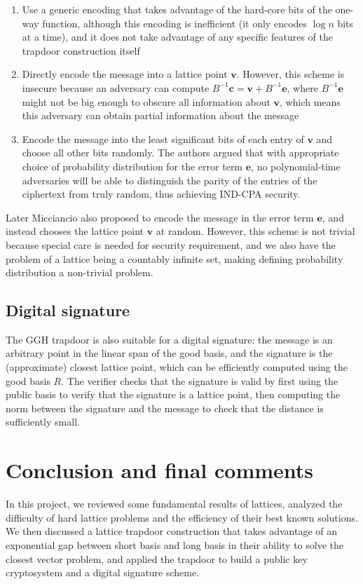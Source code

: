 \documentclass[letterpaper,12pt]{article}
\begin{document}
\begin{enumerate}
    \item Use a generic encoding that takes advantage of the hard-core bits of the one-way function, although this encoding is inefficient (it only encodes $\log{n}$ bits at a time), and it does not take advantage of any specific features of the trapdoor construction itself
    \item Directly encode the message into a lattice point $\mathbf{v}$. However, this scheme is insecure because an adversary can compute $B^{-1}\mathbf{c} = \mathbf{v} + B^{-1}\mathbf{e}$, where $B^{-1}\mathbf{e}$ might not be big enough to obscure all information about $\mathbf{v}$, which means this adversary can obtain partial information about the message
    \item Encode the message into the least significant bits of each entry of $\mathbf{v}$ and choose all other bits randomly. The authors argued that with appropriate choice of probability distribution for the error term $\mathbf{e}$, no polynomial-time adversaries will be able to distinguish the parity of the entries of the ciphertext from truly random, thus achieving IND-CPA security.
\end{enumerate}

Later Micciancio also proposed to encode the message in the error term $\mathbf{e}$, and instead chooses the lattice point $\mathbf{v}$ at random. However, this scheme is not trivial because special care is needed for security requirement, and we also have the problem of a lattice being a countably infinite set, making defining probability distribution a non-trivial problem.

\subsection{Digital signature}
The GGH trapdoor is also suitable for a digital signature: the message is an arbitrary point in the linear span of the good basis, and the signature is the (approximate) closest lattice point, which can be efficiently computed using the good basis $R$. The verifier checks that the signature is valid by first using the public basis to verify that the signature is a lattice point, then computing the norm between the signature and the message to check that the distance is sufficiently small.

\section{Conclusion and final comments}
In this project, we reviewed some fundamental results of lattices, analyzed the difficulty of hard lattice problems and the efficiency of their best known solutions. We then discussed a lattice trapdoor construction that takes advantage of an exponential gap between short basis and long basis in their ability to solve the closest vector problem, and applied the trapdoor to build a public key cryptosystem and a digital signature scheme.
\end{document}
